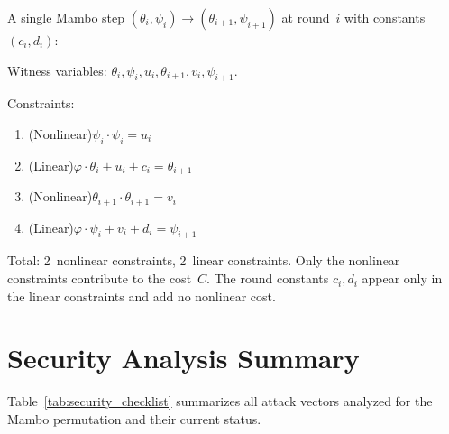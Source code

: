 \documentclass[11pt,a4paper]{article}
\theoremstyle{definition}
\begin{document}
A single Mambo step $(\theta_i, \psi_i) \to (\theta_{i+1}, \psi_{i+1})$
at round~$i$ with constants $(c_i, d_i)$:

Witness variables: $\theta_i, \psi_i, u_i, \theta_{i+1}, v_i, \psi_{i+1}$.

Constraints:
\begin{enumerate}[nosep]
  \item (Nonlinear)\quad $\psi_i \cdot \psi_i = u_i$
  \item (Linear)\quad $\varphi\cdot\theta_i + u_i + c_i = \theta_{i+1}$
  \item (Nonlinear)\quad $\theta_{i+1} \cdot \theta_{i+1} = v_i$
  \item (Linear)\quad $\varphi\cdot\psi_i + v_i + d_i = \psi_{i+1}$
\end{enumerate}

Total: 2~nonlinear constraints, 2~linear constraints. Only the nonlinear
constraints contribute to the cost~$C$. The round constants $c_i, d_i$
appear only in the linear constraints and add no nonlinear cost.


\section{Security Analysis Summary}\label{app:security_checklist}

Table~\ref{tab:security_checklist} summarizes all attack vectors analyzed
for the Mambo permutation and their current status.
\end{document}
